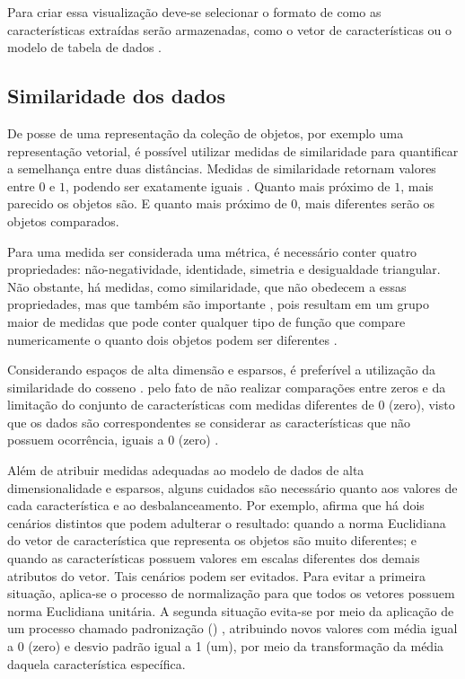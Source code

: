 		Para criar essa visualização deve-se selecionar o formato
		de como as características extraídas serão armazenadas, como o vetor de
		características ou o modelo de tabela de dados \cite{de2003}.

		\subsection{Similaridade dos dados}
		\label{subsec:similaridade}
			De posse de uma representação da coleção de objetos, por exemplo uma representação
			vetorial, é possível utilizar medidas de similaridade para quantificar a semelhança
			entre duas distâncias. Medidas de similaridade retornam valores entre $0$ e $1$,
			podendo ser exatamente iguais \cite{Alencar}. Quanto mais próximo de $1$, mais
			parecido os objetos são. E quanto mais próximo de $0$, mais diferentes serão os objetos
			comparados.
			
			Para uma medida ser considerada uma métrica, é necessário conter quatro propriedades:
			não-negatividade, identidade, simetria e desigualdade triangular. Não obstante, há
			medidas, como similaridade, que não obedecem a essas propriedades, mas que também
			são importante \cite{phd:paulovich}, pois resultam em um grupo maior de medidas que
			pode conter qualquer tipo de função que compare numericamente o quanto dois objetos
			podem ser diferentes \cite{Tan:2005:IDM:1095618}.
			
			Considerando espaços de alta dimensão e esparsos, é preferível a utilização da
			similaridade do cosseno \cite{phd:paulovich}. pelo fato de não realizar
			comparações entre zeros e da limitação do conjunto de características com
			medidas diferentes de 0 (zero), visto que os dados são correspondentes se
			considerar as características que não possuem ocorrência, iguais a $0$
			(zero) \cite{Tan:2005:IDM:1095618,phd:paulovich}.

			
			Além de atribuir medidas adequadas ao modelo de dados de alta dimensionalidade
			e esparsos, alguns cuidados são necessário quanto aos valores de cada
			característica e ao desbalanceamento. Por exemplo, 
			afirma que há dois cenários distintos que podem adulterar o resultado: quando
			a norma Euclidiana do vetor de característica que representa os objetos são
			muito diferentes; e quando as características possuem valores em escalas
			diferentes dos demais atributos do vetor. Tais cenários podem ser evitados.
			Para evitar a primeira situação, aplica-se o processo de normalização para
			que todos os vetores possuem norma Euclidiana unitária. A segunda situação
			evita-se por meio da aplicação de um processo chamado padronização
			() \cite{Tan:2005:IDM:1095618}, atribuindo novos
			valores com média igual a 0 (zero) e desvio padrão igual a 1 (um), por meio
			da transformação da média daquela característica específica.
			
